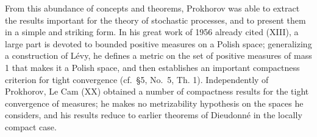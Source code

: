 From this abundance of concepts and theorems, Prokhorov was able to extract the results important for the theory of stochastic processes, and to present them in a simple and striking form. In his great work of 1956 already cited (XIII), a large part is devoted to bounded positive measures on a Polish space; generalizing a construction of Lévy, he defines a metric on the set of positive measures of mass 1 that makes it a Polish space, and then establishes an important compactness criterion for tight convergence (cf.~§5, No.~5, Th. 1). Independently of Prokhorov, Le Cam (XX) obtained a number of compactness results for the tight convergence of measures; he makes no metrizability hypothesis on the spaces he considers, and his results reduce to earlier theorems of Dieudonné in the locally compact case.


